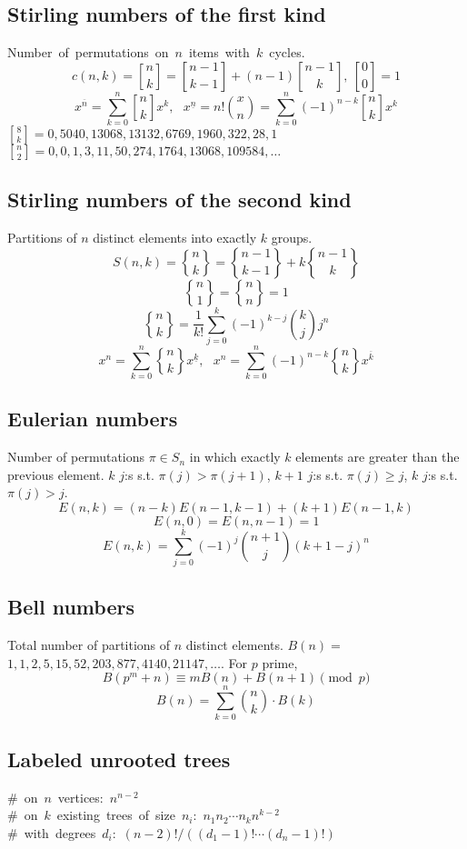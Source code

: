 	\subsection{Stirling numbers of the first kind}
		\mbox{Number of permutations on $n$ items with $k$ cycles.}
		$$c(n,k) = {n\brack k}={n-1 \brack k-1} + (n-1) {n-1 \brack k},\ {0 \brack 0} = 1 $$
		$$x^{\overline{n}} = \sum_{k=0}^n {n\brack k}x^k, \ \ \ x^{\underline{n}} = n!{x \choose n} = \sum_{k=0}^n (-1)^{n-k} {n\brack k} x^k $$
		\mbox{${8 \brack k} = 0, 5040, 13068, 13132, 6769, 1960, 322, 28, 1$}
		\mbox{${n \brack 2} = 0, 0, 1, 3, 11, 50, 274, 1764, 13068, 109584, \dots$}

	\subsection{Stirling numbers of the second kind}
		Partitions of $n$ distinct elements into exactly $k$ groups.
		$$S(n,k) = {n \brace k} = {n-1 \brace k-1} + k {n-1 \brace k}$$
		$${n \brace 1} = {n \brace n} = 1$$
		$${n \brace k} = \frac{1}{k!}\sum_{j=0}^k (-1)^{k-j}\binom{k}{j}j^n$$
		$$x^n = \sum_{k=0}^n {n\brace k}x^{\underline{k}}, \ \ \ x^n = \sum_{k=0}^n (-1)^{n-k} {n\brace k} x^{\overline{k}} $$

	\subsection{Eulerian numbers}
		Number of permutations $\pi \in S_n$ in which exactly $k$ elements are greater than the previous element. $k$ $j$:s s.t. $\pi(j)>\pi(j+1)$, $k+1$ $j$:s s.t. $\pi(j)\geq j$, $k$ $j$:s s.t. $\pi(j)>j$.
		$$E(n,k) = (n-k)E(n-1,k-1) + (k+1)E(n-1,k)$$
		$$E(n,0) = E(n,n-1) = 1$$
		$$E(n,k) = \sum_{j=0}^k(-1)^j\binom{n+1}{j}(k+1-j)^n$$

	\subsection{Bell numbers}
		Total number of partitions of $n$ distinct elements. $B(n) =$
		$1, 1, 2, 5, 15, 52, 203, 877, 4140, 21147, \dots$. For $p$ prime,
		\[ B(p^m+n)\equiv mB(n)+B(n+1) \pmod{p} \]
		$$B(n) = \sum_{k=0}^n \binom{n}{k}\cdot B(k)$$

	\subsection{Labeled unrooted trees}
		\mbox{\# on $n$ vertices: $n^{n-2}$} \\
		\mbox{\# on $k$ existing trees of size $n_i$: $n_1n_2\cdots n_k n^{k-2}$} \\
		\mbox{\# with degrees $d_i$: $(n-2)! / ((d_1-1)! \cdots (d_n-1)!)$}

